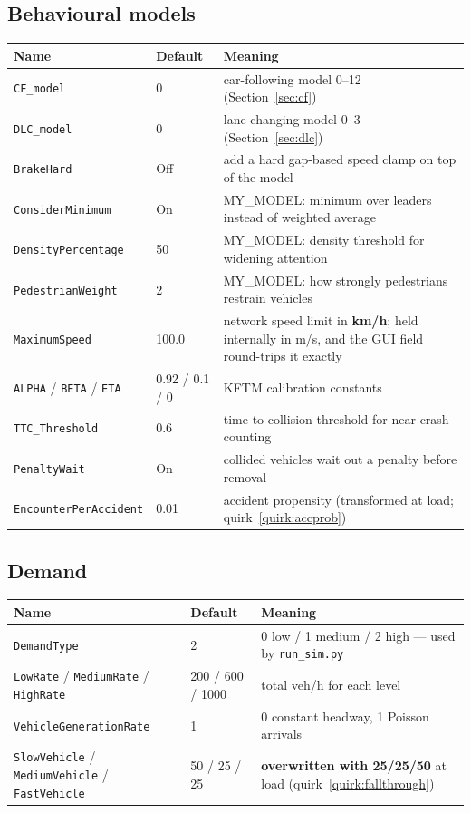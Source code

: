 \documentclass[11pt, a4paper]{article}
\newcommand{\code}[1]{\texttt{#1}}
\begin{document}
\subsection{Behavioural models}
\begin{tabularx}{\textwidth}{l l X}
\toprule
\textbf{Name} & \textbf{Default} & \textbf{Meaning} \\
\midrule
\code{CF\_model} & 0 & car-following model 0--12 (Section~\ref{sec:cf}) \\
\code{DLC\_model} & 0 & lane-changing model 0--3 (Section~\ref{sec:dlc}) \\
\code{BrakeHard} & Off & add a hard gap-based speed clamp on top of the model \\
\code{ConsiderMinimum} & On & MY\_MODEL: minimum over leaders instead of weighted average \\
\code{DensityPercentage} & 50 & MY\_MODEL: density threshold for widening attention \\
\code{PedestrianWeight} & 2 & MY\_MODEL: how strongly pedestrians restrain vehicles \\
\code{MaximumSpeed} & 100.0 & network speed limit in \textbf{km/h}; held internally in m/s, and the GUI field round-trips it exactly \\
\code{ALPHA} / \code{BETA} / \code{ETA} & 0.92 / 0.1 / 0 & KFTM calibration constants \\
\code{TTC\_Threshold} & 0.6 & time-to-collision threshold for near-crash counting \\
\code{PenaltyWait} & On & collided vehicles wait out a penalty before removal \\
\code{EncounterPerAccident} & 0.01 & accident propensity (transformed at load; quirk~\ref{quirk:accprob}) \\
\bottomrule
\end{tabularx}

\subsection{Demand}
\begin{tabularx}{\textwidth}{l l X}
\toprule
\textbf{Name} & \textbf{Default} & \textbf{Meaning} \\
\midrule
\code{DemandType} & 2 & 0 low / 1 medium / 2 high --- used by \code{run\_sim.py} \\
\code{LowRate} / \code{MediumRate} / \code{HighRate} & 200 / 600 / 1000 & total veh/h for each level \\
\code{VehicleGenerationRate} & 1 & 0 constant headway, 1 Poisson arrivals \\
\code{SlowVehicle} / \code{MediumVehicle} / \code{FastVehicle} & 50 / 25 / 25 & \textbf{overwritten with 25/25/50} at load (quirk~\ref{quirk:fallthrough}) \\
\bottomrule
\end{tabularx}
\end{document}
